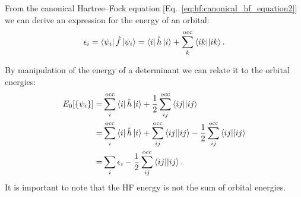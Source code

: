 \documentclass[../Main/chem532-notes.tex]{subfiles}
\begin{document}
From the canonical Hartree--Fock equation [Eq.~\eqref{eq:hf:canonical_hf_equation2}] we can derive an expression for the energy of an orbital:
\begin{equation}
\epsilon_{i}
=
\bra{\psi_{i}} \hat{f}\ket{\psi_{i}} = \bra{i} \hat{h} \ket{i} + \sum_{k}^{\rm occ} \bra{ik}\!\ket{ik}.
\end{equation}

By manipulation of the energy of a determinant we can relate it to the orbital energies:
\begin{equation}
\begin{split}
E_0[\{ \psi_i \}] =& \sum_i^{\rm occ} \bra{i} \hat{h} \ket{i} + \frac{1}{2} \sum_{ij}^{\rm occ} \bra{ij}\!\ket{ij} \\
=& \sum_i^{\rm occ} \bra{i} \hat{h} \ket{i} + \sum_{ij}^{\rm occ} \bra{ij}\!\ket{ij}
-\frac{1}{2} \sum_{ij}^{\rm occ} \bra{ij}\!\ket{ij} \\
=& \sum_i \epsilon_i - 
\frac{1}{2} \sum_{ij}^{\rm occ} \bra{ij}\!\ket{ij}.
\end{split}
\end{equation}
It is important to note that the HF energy is not the sum of orbital energies.
\end{document}
